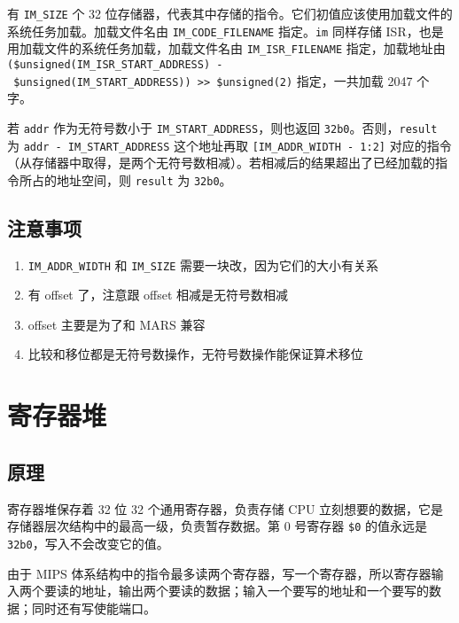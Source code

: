 \documentclass[12pt,AutoFakeBold,AutoFakeSlant]{article}
\providecommand{\tightlist}{%
  \setlength{\itemsep}{0pt}\setlength{\parskip}{0pt}}
\begin{document}
有 \texttt{IM\_SIZE} 个 32
位存储器，代表其中存储的指令。它们初值应该使用加载文件的系统任务加载。加载文件名由
\texttt{IM\_CODE\_FILENAME} 指定。\texttt{im} 同样存储
ISR，也是用加载文件的系统任务加载，加载文件名由
\texttt{IM\_ISR\_FILENAME} 指定，加载地址由
\texttt{(\$unsigned(IM\_ISR\_START\_ADDRESS)\ -\ \$unsigned(IM\_START\_ADDRESS))\ \textgreater{}\textgreater{}\ \$unsigned(2)}
指定，一共加载 2047 个字。

若 \texttt{addr} 作为无符号数小于 \texttt{IM\_START\_ADDRESS}，则也返回
\texttt{32\textquotesingle{}b0}。否则，\texttt{result} 为
\texttt{addr\ -\ IM\_START\_ADDRESS} 这个地址再取
\texttt{{[}IM\_ADDR\_WIDTH\ -\ 1:2{]}}
对应的指令（从存储器中取得，是两个无符号数相减）。若相减后的结果超出了已经加载的指令所占的地址空间，则
\texttt{result} 为 \texttt{32\textquotesingle{}b0}。

\hypertarget{ux6ce8ux610fux4e8bux9879-2}{%
\subsection{注意事项}\label{ux6ce8ux610fux4e8bux9879-2}}

\begin{enumerate}
\def\labelenumi{\arabic{enumi}.}
\tightlist
\item
  \texttt{IM\_ADDR\_WIDTH} 和 \texttt{IM\_SIZE}
  需要一块改，因为它们的大小有关系
\item
  有 offset 了，注意跟 offset 相减是无符号数相减
\item
  offset 主要是为了和 MARS 兼容
\item
  比较和移位都是无符号数操作，无符号数操作能保证算术移位
\end{enumerate}

\hypertarget{ux5bc4ux5b58ux5668ux5806}{%
\section{寄存器堆}\label{ux5bc4ux5b58ux5668ux5806}}

\hypertarget{ux539fux7406-3}{%
\subsection{原理}\label{ux539fux7406-3}}

寄存器堆保存着 32 位 32 个通用寄存器，负责存储 CPU
立刻想要的数据，它是存储器层次结构中的最高一级，负责暂存数据。第 0
号寄存器 \texttt{\$0} 的值永远是
\texttt{32\textquotesingle{}b0}，写入不会改变它的值。

由于 MIPS
体系结构中的指令最多读两个寄存器，写一个寄存器，所以寄存器输入两个要读的地址，输出两个要读的数据；输入一个要写的地址和一个要写的数据；同时还有写使能端口。
\end{document}
